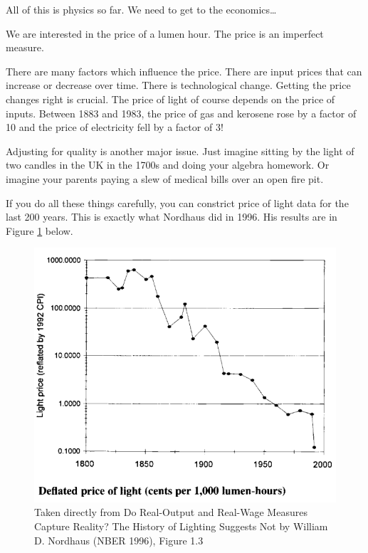 \documentclass[
]{book}
\begin{document}
All of this is physics so far. We need to get to the economics\ldots{}

We are interested in the price of a lumen hour. The price is an imperfect measure.

There are many factors which influence the price. There are input prices that can increase or decrease over time. There is technological change. Getting the price changes right is crucial. The price of light of course depends on the price of inputs. Between 1883 and 1983, the price of gas and kerosene rose by a factor of 10 and the price of electricity fell by a factor of 3!

Adjusting for quality is another major issue. Just imagine sitting by the light of two candles in the UK in the 1700s and doing your algebra homework. Or imagine your parents paying a slew of medical bills over an open fire pit.

If you do all these things carefully, you can constrict price of light data for the last 200 years. This is exactly what Nordhaus did in 1996. His results are in Figure \ref{fig:nordhausfig1p3} below.

\begin{figure}

{\centering \includegraphics[width=1\linewidth]{img/growth2/nordhausfig1p3} 

}

\caption{Taken directly from Do Real-Output and Real-Wage Measures Capture Reality? The History of Lighting Suggests Not by William D. Nordhaus (NBER 1996), Figure 1.3}\label{fig:nordhausfig1p3}
\end{figure}
\end{document}
